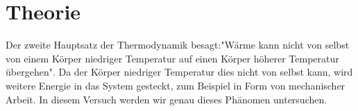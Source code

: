 \section{Theorie}
\label{sec:Theorie}
Der zweite Hauptsatz der Thermodynamik besagt:"Wärme kann nicht von selbst von einem Körper niedriger Temperatur auf einen Körper höherer Temperatur übergehen".
Da der Körper niedriger Temperatur dies nicht von selbst kann, wird weitere Energie in das System gesteckt, zum Beispiel in Form von mechanischer Arbeit.
 In diesem Versuch werden wir genau dieses Phänomen untersuchen.
\cite{sample}
